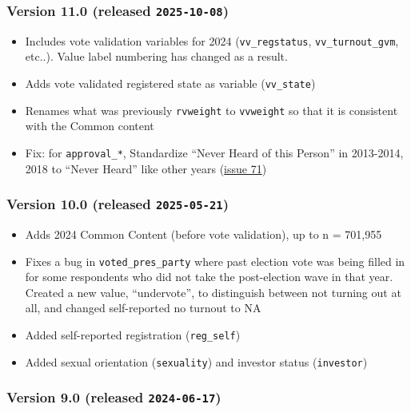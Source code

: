 \documentclass[10pt,article,oneside]{memoir}
\begin{document}
\subsubsection{\texorpdfstring{Version 11.0 (released
\texttt{2025-10-08})}{Version 11.0 (released 2025-10-08)}}\label{version-11.0-released-2025-10-08}

\begin{itemize}
\tightlist
\item
  Includes vote validation variables for 2024 (\texttt{vv\_regstatus},
  \texttt{vv\_turnout\_gvm}, etc..). Value label numbering has changed
  as a result.
\item
  Adds vote validated registered state as variable (\texttt{vv\_state})
\item
  Renames what was previously \texttt{rvweight} to \texttt{vvweight} so
  that it is consistent with the Common content
\item
  Fix: for \texttt{approval\_*}, Standardize ``Never Heard of this
  Person'' in 2013-2014, 2018 to ``Never Heard'' like other years
  (\href{https://github.com/kuriwaki/cces_cumulative/issues/71}{issue
  71})
\end{itemize}

\subsubsection{\texorpdfstring{Version 10.0 (released
\texttt{2025-05-21})}{Version 10.0 (released 2025-05-21)}}\label{version-10.0-released-2025-05-21}

\begin{itemize}
\tightlist
\item
  Adds 2024 Common Content (before vote validation), up to n = 701,955
\item
  Fixes a bug in \texttt{voted\_pres\_party} where past election vote
  was being filled in for some respondents who did not take the
  post-election wave in that year. Created a new value, ``undervote'',
  to distinguish between not turning out at all, and changed
  self-reported no turnout to NA
\item
  Added self-reported registration (\texttt{reg\_self})
\item
  Added sexual orientation (\texttt{sexuality}) and investor status
  (\texttt{investor})
\end{itemize}

\subsubsection{\texorpdfstring{Version 9.0 (released
\texttt{2024-06-17})}{Version 9.0 (released 2024-06-17)}}\label{version-9.0-released-2024-06-17}
\end{document}
